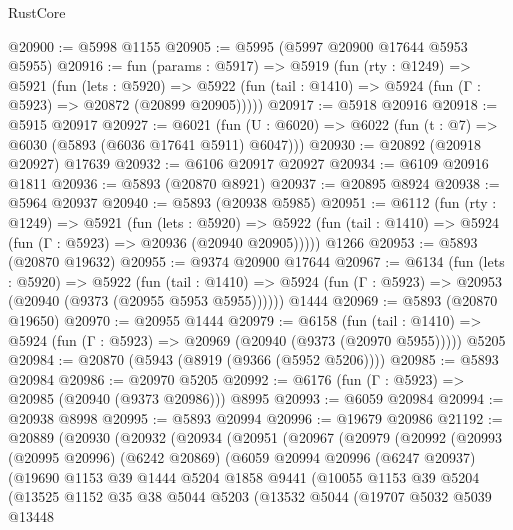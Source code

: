 \begin{lexlean}{RustCore}
\begin{coremodule}
@20900 := @5998 @1155
@20905 := @5995 (@5997 @20900 @17644 @5953 @5955)
@20916 := fun (params : @5917) =>
  @5919
    (fun (rty : @1249) =>
    @5921
      (fun (lets : @5920) =>
      @5922 (fun (tail : @1410) => @5924 (fun (Γ : @5923) => @20872 (@20899 @20905)))))
@20917 := @5918 @20916
@20918 := @5915 @20917
@20927 := @6021
    (fun (U : @6020) => @6022 (fun (t : @7) => @6030 (@5893 (@6036 @17641 @5911) @6047)))
@20930 := @20892 (@20918 @20927) @17639
@20932 := @6106 @20917 @20927
@20934 := @6109 @20916 @1811
@20936 := @5893 (@20870 @8921)
@20937 := @20895 @8924
@20938 := @5964 @20937
@20940 := @5893 (@20938 @5985)
@20951 := @6112
    (fun (rty : @1249) =>
    @5921
      (fun (lets : @5920) =>
      @5922 (fun (tail : @1410) => @5924 (fun (Γ : @5923) => @20936 (@20940 @20905)))))
    @1266
@20953 := @5893 (@20870 @19632)
@20955 := @9374 @20900 @17644
@20967 := @6134
    (fun (lets : @5920) =>
    @5922
      (fun (tail : @1410) =>
      @5924 (fun (Γ : @5923) => @20953 (@20940 (@9373 (@20955 @5953 @5955))))))
    @1444
@20969 := @5893 (@20870 @19650)
@20970 := @20955 @1444
@20979 := @6158
    (fun (tail : @1410) => @5924 (fun (Γ : @5923) => @20969 (@20940 (@9373 (@20970 @5955)))))
    @5205
@20984 := @20870 (@5943 (@8919 (@9366 (@5952 @5206))))
@20985 := @5893 @20984
@20986 := @20970 @5205
@20992 := @6176 (fun (Γ : @5923) => @20985 (@20940 (@9373 @20986))) @8995
@20993 := @6059 @20984
@20994 := @20938 @8998
@20995 := @5893 @20994
@20996 := @19679 @20986
@21192 := @20889
    (@20930
      (@20932
        (@20934
          (@20951
            (@20967
              (@20979
                (@20992
                  (@20993
                    (@20995 @20996)
                    (@6242 @20869)
                    (@6059
                      @20994
                      @20996
                      (@6247 @20937)
                      (@19690
                        @1153
                        @39
                        @1444
                        @5204
                        @1858
                        @9441
                        (@10055
                          @1153
                          @39
                          @5204
                          (@13525
                            @1152
                            @35
                            @38
                            @5044
                            @5203
                            (@13532
                              @5044
                              (@19707
                                @5032
                                @5039
                                @13448

\end{coremodule}
\end{lexlean}
